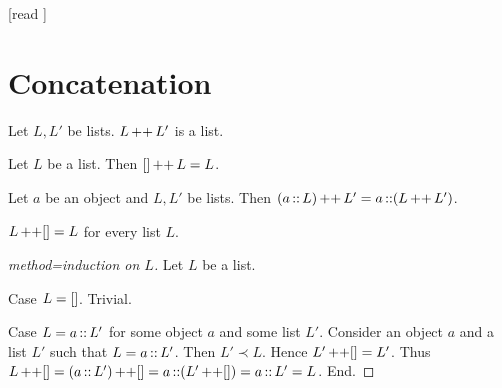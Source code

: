\documentclass[10pt]{article}
\begin{document}
  \begin{imports}
    \begin{forthel}
      [read ]
    \end{forthel}
  \end{imports}


  \section*{Concatenation}

  \begin{forthel}
    \begin{signature}[id=LISTS_CONCAT_4578620297183232,printid]
      Let $L, L'$ be lists.
      $L \mathop{++} L'$ is a list.
    \end{signature}
  \end{forthel}

  \begin{forthel}
    \begin{axiom}[id=LISTS_CONCAT_3703161885818880,printid]
      Let $L$ be a list.
      Then $[] \mathop{++} L = L$.
    \end{axiom}
  \end{forthel}

  \begin{forthel}
    \begin{axiom}[id=LISTS_CONCAT_8050301789536256,printid]
      Let $a$ be an object and $L, L'$ be lists.
      Then $(a \mathop{::} L) \mathop{++} L' = a \mathop{::} (L \mathop{++} L')$.
    \end{axiom}
  \end{forthel}

  \begin{forthel}
    \begin{proposition}[id=LISTS_CONCAT_4512036658964875,printid]
      $L \mathop{++} [] = L$ for every list $L$.
    \end{proposition}
    \begin{proof}[method=induction on $L$]
      Let $L$ be a list.

      Case $L = []$. Trivial.
      
      Case $L = a \mathop{::} L'$ for some object $a$ and some list $L'$.
        Consider an object $a$ and a list $L'$ such that $L = a \mathop{::} L'$.
        Then $L' \prec L$.
        Hence $L' \mathop{++} [] = L'$.
        Thus $L \mathop{++} []
          = (a \mathop{::} L') \mathop{++} []
          = a \mathop{::} (L' \mathop{++} [])
          = a \mathop{::} L'
          = L$.
      End.
    \end{proof}
  \end{forthel}
\end{document}
